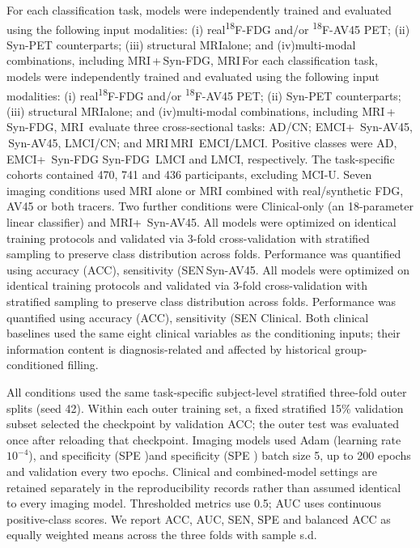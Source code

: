 \documentclass{article}
\providecommand{\DIFaddtex}[1]{{\protect\color{blue} \sf #1}} %
\providecommand{\DIFdeltex}[1]{{\protect\color{red} \ifmmode #1\else\scriptsize #1\fi}} %
\providecommand{\DIFaddbegin}{} %
\providecommand{\DIFaddend}{} %
\providecommand{\DIFdelbegin}{} %
\providecommand{\DIFdelend}{} %
\providecommand{\DIFadd}[1]{\texorpdfstring{\DIFaddtex{#1}}{#1}} %
\providecommand{\DIFdel}[1]{\texorpdfstring{\DIFdeltex{#1}}{}} %
\newcommand{\DIFscaledelfig}{0.5}
\newlength{\DIFdelgraphicswidth} %
\newlength{\DIFdelgraphicsheight} %
\newcommand{\DIFaddincludegraphics}[2][]{{\color{blue}\fbox{\DIFOincludegraphics[#1]{#2}}}} %
\newcommand{\DIFdelincludegraphics}[2][]{%
\sbox{\DIFdelgraphicsbox}{\DIFOincludegraphics[#1]{#2}}%
\settoboxwidth{\DIFdelgraphicswidth}{\DIFdelgraphicsbox} %
\settoboxtotalheight{\DIFdelgraphicsheight}{\DIFdelgraphicsbox} %
\scalebox{\DIFscaledelfig}{%
\parbox[b]{\DIFdelgraphicswidth}{\usebox{\DIFdelgraphicsbox}\\[-\baselineskip] \rule{\DIFdelgraphicswidth}{0em}}\llap{\resizebox{\DIFdelgraphicswidth}{\DIFdelgraphicsheight}{%
\setlength{\unitlength}{\DIFdelgraphicswidth}%
\begin{picture}(1,1)%
\thicklines\linethickness{2pt} %
{\color[rgb]{1,0,0}\put(0,0){\framebox(1,1){}}}%
{\color[rgb]{1,0,0}\put(0,0){\line( 1,1){1}}}%
{\color[rgb]{1,0,0}\put(0,1){\line(1,-1){1}}}%
\end{picture}%
}\hspace*{3pt}}} %
} %
\DeclareRobustCommand{\DIFaddbegin}{\DIFOaddbegin \let\includegraphics\DIFaddincludegraphics} %
\DeclareRobustCommand{\DIFaddend}{\DIFOaddend \let\includegraphics\DIFOincludegraphics} %
\DeclareRobustCommand{\DIFdelbegin}{\DIFOdelbegin \let\includegraphics\DIFdelincludegraphics} %
\DeclareRobustCommand{\DIFdelend}{\DIFOaddend \let\includegraphics\DIFOincludegraphics} %
\begin{document}
\DIFdel{For each classification task, models were independently trained and evaluated using the following input modalities: (i) real\textsuperscript{18}F-FDG and/or \textsuperscript{18}F-AV45 PET; (ii) Syn-PET counterparts; (iii) structural MRIalone; and (iv)multi-modal combinations, including MRI\,+\,Syn-FDG, MRI\,}\DIFdelend \DIFaddbegin \DIFadd{evaluate three cross-sectional tasks: AD/CN; EMCI}\DIFaddend +\DIFdelbegin \DIFdel{\,Syn-AV45, }\DIFdelend \DIFaddbegin \DIFadd{LMCI/CN; }\DIFaddend and \DIFdelbegin \DIFdel{MRI\,}\DIFdelend \DIFaddbegin \DIFadd{EMCI/LMCI. Positive classes were AD, EMCI}\DIFaddend +\DIFdelbegin \DIFdel{\,Syn-FDG\,}\DIFdelend \DIFaddbegin \DIFadd{LMCI and LMCI, respectively. The task-specific cohorts contained 470, 741 and 436 participants, excluding MCI-U. Seven imaging conditions used MRI alone or MRI combined with real/synthetic FDG, AV45 or both tracers. Two further conditions were Clinical-only (an 18-parameter linear classifier) and MRI}\DIFaddend +\DIFdelbegin \DIFdel{\,Syn-AV45. All models were optimized on identical training protocols and validated via 3-fold cross-validation with stratified sampling to preserve class distribution across folds. Performance was quantified using accuracy (ACC), sensitivity (SEN}\DIFdelend \DIFaddbegin \DIFadd{Clinical. Both clinical baselines used the same eight clinical variables as the conditioning inputs; their information content is diagnosis-related and affected by historical group-conditioned filling.
}

\DIFadd{All conditions used the same task-specific subject-level stratified three-fold outer splits (seed 42). Within each outer training set, a fixed stratified 15\% validation subset selected the checkpoint by validation ACC; the outer test was evaluated once after reloading that checkpoint. Imaging models used Adam (learning rate $10^{-4}$}\DIFaddend ), \DIFdelbegin \DIFdel{and specificity (SPE )}\DIFdelend \DIFaddbegin \DIFadd{batch size 5, up to 200 epochs and validation every two epochs. Clinical and combined-model settings are retained separately in the reproducibility records rather than assumed identical to every imaging model. Thresholded metrics use 0.5; AUC uses continuous positive-class scores. We report ACC, AUC, SEN, SPE and balanced ACC as equally weighted means across the three folds with sample s.d}\DIFaddend .
\end{document}

